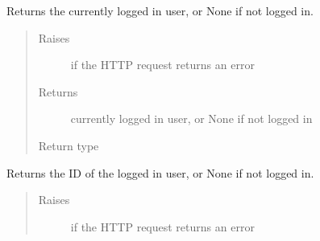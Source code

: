 \documentclass[letterpaper,10pt,english]{sphinxmanual}
\begin{document}
\begin{fulllineitems}
\begin{fulllineitems}
\begin{quote}
\begin{description}
\end{description}\end{quote}

\end{fulllineitems}


\begin{fulllineitems}
\label{\detokenize{autoapi/pine/client/client/index:pine.client.client.PineClient.get_logged_in_user}}
Returns the currently logged in user, or None if not logged in.
\begin{quote}\begin{description}
\item[{Raises}] \leavevmode
{\hyperref[\detokenize{autoapi/pine/client/exceptions/index:pine.client.exceptions.PineClientHttpException}]{}} \textendash{} if the HTTP request returns an error

\item[{Returns}] \leavevmode
currently logged in user, or None if not logged in

\item[{Return type}] \leavevmode
{}

\end{description}\end{quote}

\end{fulllineitems}


\begin{fulllineitems}
\label{\detokenize{autoapi/pine/client/client/index:pine.client.client.PineClient.get_my_user_id}}
Returns the ID of the logged in user, or None if not logged in.
\begin{quote}\begin{description}
\item[{Raises}] \leavevmode
{\hyperref[\detokenize{autoapi/pine/client/exceptions/index:pine.client.exceptions.PineClientHttpException}]{}} \textendash{} if the HTTP request returns an error


\end{description}
\end{quote}
\end{fulllineitems}
\end{fulllineitems}
\end{document}
